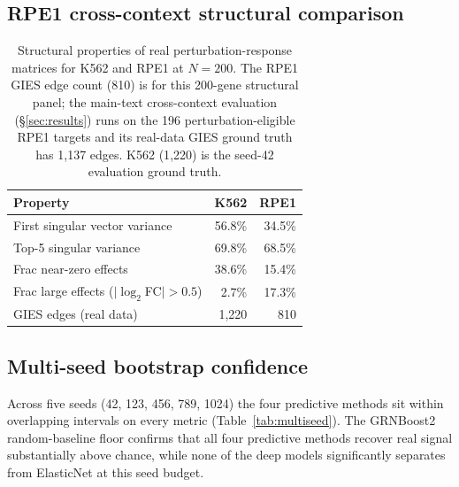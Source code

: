 \documentclass{article}
\theoremstyle{plain}
\theoremstyle{definition}
\theoremstyle{remark}
\begin{document}
\subsection{RPE1 cross-context structural comparison}

\begin{table}[h]
\centering
\small
\begin{tabular}{lrr}
\toprule
\textbf{Property} & \textbf{K562} & \textbf{RPE1} \\
\midrule
First singular vector variance     & 56.8\% & 34.5\% \\
Top-5 singular variance            & 69.8\% & 68.5\% \\
Frac near-zero effects             & 38.6\% & 15.4\% \\
Frac large effects ($|\log_2$FC$|>0.5$) & 2.7\%  & 17.3\% \\
GIES edges (real data)             & 1{,}220 & 810 \\
\bottomrule
\end{tabular}
\caption{Structural properties of real perturbation-response matrices for K562 and RPE1 at $N{=}200$. The RPE1 GIES edge count (810) is for this 200-gene structural panel; the main-text cross-context evaluation (\S\ref{sec:results}) runs on the 196 perturbation-eligible RPE1 targets and its real-data GIES ground truth has 1{,}137 edges. K562 (1{,}220) is the seed-42 evaluation ground truth.}
\end{table}

\subsection{Multi-seed bootstrap confidence}
\label{app:multi_seed}

Across five seeds (42, 123, 456, 789, 1024) the four predictive methods sit within overlapping intervals on every metric (Table~\ref{tab:multiseed}). The GRNBoost2 random-baseline floor confirms that all four predictive methods recover real signal substantially above chance, while none of the deep models significantly separates from ElasticNet at this seed budget.
\end{document}
